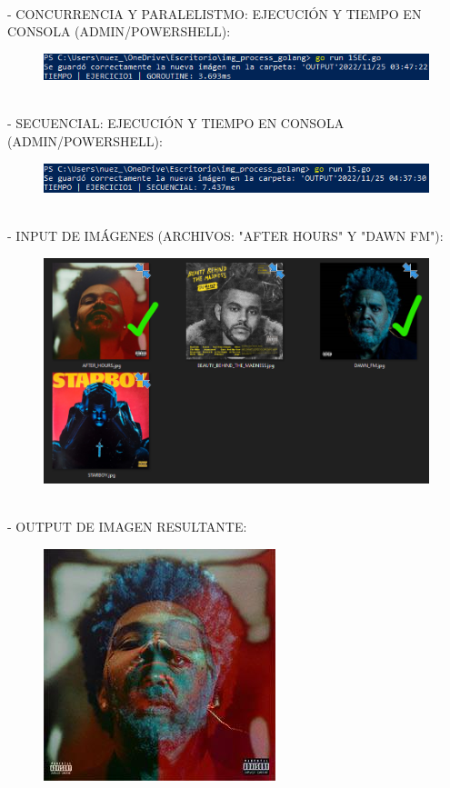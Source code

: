 \documentclass{article}
\begin{document}
\\
- CONCURRENCIA Y PARALELISTMO: EJECUCIÓN Y TIEMPO EN CONSOLA (ADMIN/POWERSHELL):
\begin{figure}[h]
\centering
\includegraphics[scale=1]{CON1.png}
\end{figure}
\\
- SECUENCIAL: EJECUCIÓN Y TIEMPO EN CONSOLA (ADMIN/POWERSHELL):
\begin{figure}[h]
\centering
\includegraphics[scale=1]{SEC1.png}
\end{figure}
\\
- INPUT DE IMÁGENES (ARCHIVOS: "AFTER HOURS" Y "DAWN FM"):
\begin{figure}[h]
\centering
\includegraphics[scale=0.4]{IMG1.png}
\end{figure}
\\
\newpage
- OUTPUT DE IMAGEN RESULTANTE:
\begin{figure}[h]
\centering
\includegraphics[scale=1]{OUTPUT_CONCURRENCIA-EJ1.jpg}
\end{figure}
\newpage
\end{document}
